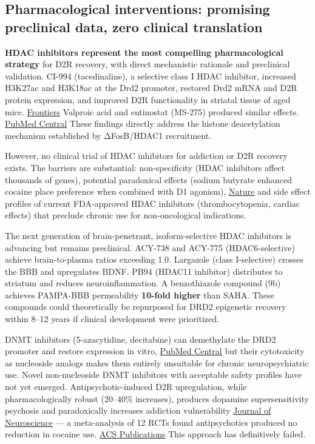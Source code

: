 \subsection{Pharmacological interventions: promising preclinical data, zero clinical translation}\label{15_d2_downregulation-pharmacological-interventions-promising-preclinical-data-zero-clinical-translation}

\textbf{HDAC inhibitors represent the most compelling pharmacological strategy} for D2R recovery, with direct mechanistic rationale and preclinical validation. CI-994 (tacedinaline), a selective class I HDAC inhibitor, increased H3K27ac and H3K18ac at the Drd2 promoter, restored Drd2 mRNA and D2R protein expression, and improved D2R functionality in striatal tissue of aged mice. \href{https://www.frontiersin.org/journals/neuroscience/articles/10.3389/fnins.2021.674745/full}{Frontiers} Valproic acid and entinostat (MS-275) produced similar effects. \href{https://pmc.ncbi.nlm.nih.gov/articles/PMC5538925/}{PubMed Central} These findings directly address the histone deacetylation mechanism established by ΔFosB/HDAC1 recruitment.

However, no clinical trial of HDAC inhibitors for addiction or D2R recovery exists. The barriers are substantial: non-specificity (HDAC inhibitors affect thousands of genes), potential paradoxical effects (sodium butyrate enhanced cocaine place preference when combined with D1 agonism), \href{https://www.nature.com/articles/npp200815}{Nature} and side effect profiles of current FDA-approved HDAC inhibitors (thrombocytopenia, cardiac effects) that preclude chronic use for non-oncological indications.

The next generation of brain-penetrant, isoform-selective HDAC inhibitors is advancing but remains preclinical. ACY-738 and ACY-775 (HDAC6-selective) achieve brain-to-plasma ratios exceeding 1.0. Largazole (class I-selective) crosses the BBB and upregulates BDNF. PB94 (HDAC11 inhibitor) distributes to striatum and reduces neuroinflammation. A benzothiazole compound (9b) achieves PAMPA-BBB permeability \textbf{10-fold higher} than SAHA. These compounds could theoretically be repurposed for DRD2 epigenetic recovery within 8--12 years if clinical development were prioritized.

DNMT inhibitors (5-azacytidine, decitabine) can demethylate the DRD2 promoter and restore expression in vitro, \href{https://pmc.ncbi.nlm.nih.gov/articles/PMC4981892/}{PubMed Central} but their cytotoxicity as nucleoside analogs makes them entirely unsuitable for chronic neuropsychiatric use. Novel non-nucleoside DNMT inhibitors with acceptable safety profiles have not yet emerged. Antipsychotic-induced D2R upregulation, while pharmacologically robust (20--40\% increases), produces dopamine supersensitivity psychosis and paradoxically increases addiction vulnerability \href{https://www.jneurosci.org/content/27/11/2979}{Journal of Neuroscience} --- a meta-analysis of 12 RCTs found antipsychotics produced no reduction in cocaine use. \href{https://pubs.acs.org/doi/10.1021/jm501512b}{ACS Publications} This approach has definitively failed.

